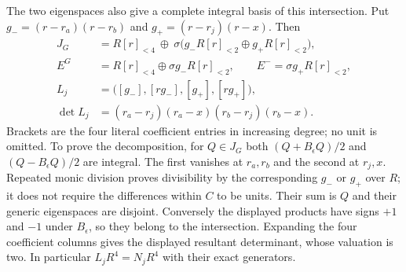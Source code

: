 \documentclass[11pt]{article}
\begin{document}
The two eigenspaces also give a complete integral basis of this
intersection. Put $g_-=(r-r_a)(r-r_b)$ and
$g_+=(r-r_j)(r-x)$. Then
\[
\begin{aligned}
 J_G&=R[r]_{<4}\ \oplus\
  \sigma\bigl(g_-R[r]_{<2}\oplus g_+R[r]_{<2}\bigr),\\
 E^{G}&=R[r]_{<4}\oplus\sigma g_-R[r]_{<2},\qquad
 E^{-}=\sigma g_+R[r]_{<2},\\
 L_j&=\bigl([g_-],[rg_-],[g_+],[rg_+]\bigr),\\
 \det L_j&=(r_a-r_j)(r_a-x)(r_b-r_j)(r_b-x).
\end{aligned}                                                   \tag{SLF14}
\]
Brackets are the four literal coefficient entries in increasing
degree; no unit is omitted. To prove the decomposition, for
$Q\in J_G$ both $(Q+B_\epsilon Q)/2$ and
$(Q-B_\epsilon Q)/2$ are integral. The first vanishes at $r_a,r_b$
and the second at $r_j,x$. Repeated monic division proves divisibility
by the corresponding $g_-$ or $g_+$ over $R$; it does not require
the differences within $C$ to be units. Their sum is $Q$ and their
generic eigenspaces are disjoint. Conversely the displayed products
have signs $+1$ and $-1$ under $B_\epsilon$, so they belong to the
intersection. Expanding the four coefficient columns gives the
displayed resultant determinant, whose valuation is two.
In particular $L_jR^4=N_jR^4$ with their exact generators.
\end{document}
